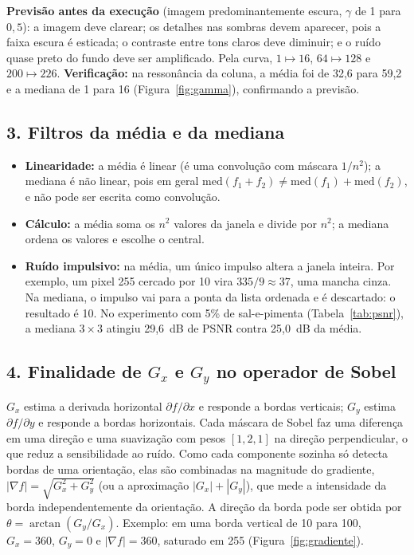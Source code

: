 \documentclass[11pt,a4paper]{article}
\begin{document}
\textbf{Previsão antes da execução} (imagem predominantemente escura, $\gamma$ de 1 para
$0{,}5$): a imagem deve clarear; os detalhes nas sombras devem aparecer, pois a faixa escura é
esticada; o contraste entre tons claros deve diminuir; e o ruído quase preto do fundo deve ser
amplificado. Pela curva, $1 \mapsto 16$, $64 \mapsto 128$ e $200 \mapsto 226$.
\textbf{Verificação:} na ressonância da coluna, a média foi de 32,6 para 59,2 e a mediana de 1
para 16 (Figura~\ref{fig:gamma}), confirmando a previsão.

\subsection*{3. Filtros da média e da mediana}

\begin{itemize}
  \item \textbf{Linearidade:} a média é linear (é uma convolução com máscara $1/n^2$); a mediana
        é não linear, pois em geral
        $\mathrm{med}(f_1 + f_2) \neq \mathrm{med}(f_1) + \mathrm{med}(f_2)$, e não pode ser
        escrita como convolução.
  \item \textbf{Cálculo:} a média soma os $n^2$ valores da janela e divide por $n^2$; a mediana
        ordena os valores e escolhe o central.
  \item \textbf{Ruído impulsivo:} na média, um único impulso altera a janela inteira. Por
        exemplo, um pixel 255 cercado por 10 vira $335/9 \approx 37$, uma mancha cinza. Na
        mediana, o impulso vai para a ponta da lista ordenada e é descartado: o resultado é 10.
        No experimento com 5\% de sal-e-pimenta (Tabela~\ref{tab:psnr}), a mediana $3 \times 3$
        atingiu 29,6~dB de PSNR contra 25,0~dB da média.
\end{itemize}

\subsection*{4. Finalidade de $G_x$ e $G_y$ no operador de Sobel}

$G_x$ estima a derivada horizontal $\partial f/\partial x$ e responde a bordas verticais; $G_y$
estima $\partial f/\partial y$ e responde a bordas horizontais. Cada máscara de Sobel faz uma
diferença em uma direção e uma suavização com pesos $[1, 2, 1]$ na direção perpendicular, o que
reduz a sensibilidade ao ruído. Como cada componente sozinha só detecta bordas de uma
orientação, elas são combinadas na magnitude do gradiente,
$|\nabla f| = \sqrt{G_x^2 + G_y^2}$ (ou a aproximação $|G_x| + |G_y|$), que mede a intensidade
da borda independentemente da orientação. A direção da borda pode ser obtida por
$\theta = \arctan(G_y/G_x)$. Exemplo: em uma borda vertical de 10 para 100, $G_x = 360$,
$G_y = 0$ e $|\nabla f| = 360$, saturado em 255 (Figura~\ref{fig:gradiente}).
\end{document}
